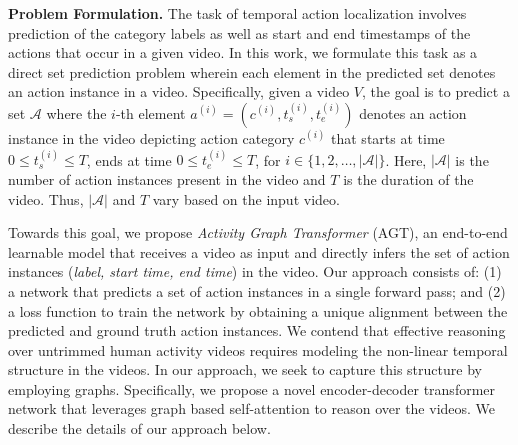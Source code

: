 \documentclass[10pt,twocolumn,letterpaper]{article}
\begin{document}
\vspace{0.05in}
\noindent
\textbf{Problem Formulation.} 
The task of temporal action localization involves prediction of the category labels as well as start and end timestamps of the actions that occur in a given video. In this work, we formulate this task as a direct set prediction problem wherein each element in the predicted set denotes an action instance in a video. Specifically, given a video $V$, the goal is to predict a set $\mathcal{A}$ where the $i$-th element $a^{(i)} = (c^{(i)}, t^{(i)}_s, t^{(i)}_e)$ denotes an action instance in the video depicting action category $c^{(i)}$ that starts at time $0 \leq t^{(i)}_s \leq T$, ends at time $0 \leq t^{(i)}_e \leq T$, for $i \in \{1, 2, \ldots, |\mathcal{A}|\}$. Here, $|\mathcal{A}|$ is the number of action instances present in the video and $T$ is the duration of the video. Thus, $|\mathcal{A}|$ and $T$ vary based on the input video. 







Towards this goal, we propose \textit{Activity Graph Transformer} (AGT), an end-to-end learnable model that receives a video as input and directly infers the set of action instances (\textit{label, start time, end time}) in the video. Our approach consists of: (1) a network that predicts a set of action instances in a single forward pass; and (2) a loss function to train the network by obtaining a unique alignment between the predicted and ground truth action instances. 
We contend that effective reasoning over untrimmed human activity videos requires modeling the non-linear temporal structure in the videos. In our approach, we seek to capture this structure by employing graphs. 
Specifically, we propose a novel encoder-decoder transformer network
that leverages graph based self-attention to reason over the videos.
We describe the details of our approach below. 
\end{document}
